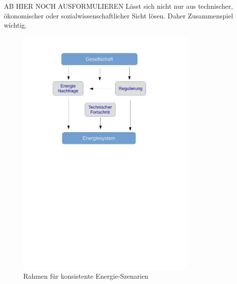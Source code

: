 \documentclass[a4paper,11pt,twoside]{scrartcl}
\begin{document}
AB HIER NOCH AUSFORMULIEREN
Lässt sich nicht nur aus technischer, ökonomischer oder sozialwissenschaftlicher Sicht lösen. Daher Zusammenspiel wichtig.

\begin{figure}[!h]
    \centering
    \includegraphics[width=0.8\textwidth]{figures/Szenarien.pdf}
    \caption{Rahmen für konsistente Energie-Szenarien}
    \label{fig:szenarien}
\end{figure}
\end{document}
